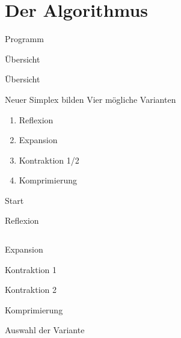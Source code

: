 \section{Der Algorithmus} 
\begin{frame}{Programm}\tableofcontents[currentsection]\end{frame}

\begin{frame}{Übersicht}
\newcommand{\highlight}{white}

\end{frame}
\begin{frame}{Übersicht}
\newcommand{\highlight}{green}

\end{frame}

\begin{frame}{Neuer Simplex bilden}
Vier mögliche Varianten
\begin{enumerate}
\item Reflexion
\item Expansion
\item Kontraktion 1/2
\item Komprimierung
\end{enumerate}
\end{frame}

\begin{center}
\begin{frame}{Start}


\end{frame}
\begin{frame}{Reflexion}
\begin{columns}[c]
	\column[c]{5cm}{}
\end{columns}
\end{frame}

\begin{frame}{Expansion}

\end{frame}
\begin{frame}{Kontraktion 1}

\end{frame}
\begin{frame}{Kontraktion 2}

\end{frame}
\begin{frame}{Komprimierung}

\end{frame}

\end{center}


\begin{frame}{Auswahl der Variante}

\end{frame}